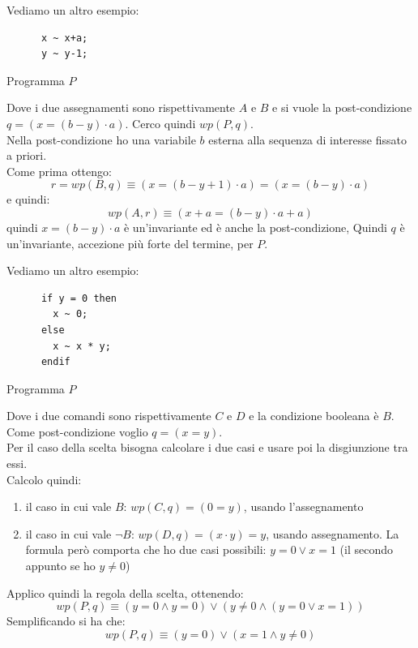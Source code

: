 				      				\begin{esempio}
				      					Vediamo un altro esempio:
				      					\begin{listing}[H]
				      						\begin{lstlisting}
      x ~ x+a;
      y ~ y-1;
				      						\end{lstlisting}
				      						\caption{Programma $P$}
				      					\end{listing}
				      					Dove i due assegnamenti sono rispettivamente $A$ e $B$ e si vuole la
				      					post-condizione $q=(x=(b-y)\cdot a)$. Cerco quindi $wp(P,q)$.\\
				      					Nella post-condizione ho una variabile $b$ esterna alla sequenza di interesse
				      					fissato a priori.\\
				      					Come prima ottengo:
				      					\[r=wp(B,q)\equiv(x=(b-y+1)\cdot a)=(x=(b-y)\cdot a)\]
				      					e quindi:
				      					\[wp(A,r)\equiv(x+a=(b-y)\cdot a+a)\]
				      					quindi $x=(b-y)\cdot a$ è un'invariante ed è anche la post-condizione, Quindi $q$
				      					è un'invariante, accezione più forte del termine, per $P$.
				      				\end{esempio}
				      				\begin{esempio}
				      					Vediamo un altro esempio:
				      					\begin{listing}[H]
				      						\begin{lstlisting}
      if y = 0 then
        x ~ 0;
      else
        x ~ x * y;
      endif
				      						\end{lstlisting}
				      						\caption{Programma $P$}
				      					\end{listing}
				      					Dove i due comandi sono rispettivamente $C$ e $D$ e la condizione booleana è
				      					$B$. Come post-condizione voglio $q=(x=y)$.\\
				      					Per il caso della scelta bisogna calcolare i due casi e usare poi la
				      					disgiunzione tra essi.\\
				      					Calcolo quindi:
				      					\begin{enumerate}
				      						\item il caso in cui vale $B$: $wp(C,q)=(0=y)$, usando l'assegnamento
				      						\item il caso in cui vale $\neg B$: $wp(D,q)=(x\cdot y)=y$, usando
				      						      assegnamento. La formula però comporta che ho due casi possibili: $y=0\lor
				      						      x=1$ (il secondo appunto se ho $y\neq 0$)
				      					\end{enumerate}
				      					Applico quindi la regola della scelta, ottenendo:
				      					\[wp(P,q)\equiv (y=0\land y=0)\lor(y\neq 0\land (y=0\lor x=1))\]
				      					Semplificando si ha che:
				      					\[wp(P,q)\equiv(y=0)\lor(x=1\land y\neq 0)\]
				      				\end{esempio}
